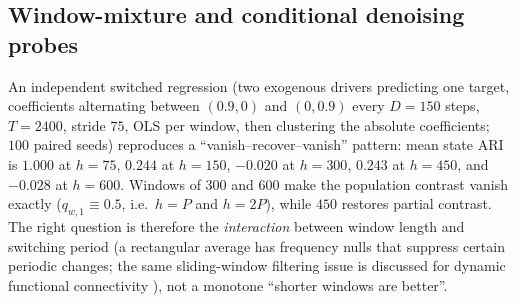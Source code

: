 \documentclass[11pt]{article}
\begin{document}
\subsection{Window-mixture and conditional denoising probes}
\label{supp:representation-probes}
An independent switched regression (two exogenous drivers predicting one target,
coefficients alternating between $(0.9,0)$ and $(0,0.9)$ every $D{=}150$ steps,
$T=2400$, stride $75$, OLS per window, then clustering the absolute coefficients;
$100$ paired seeds) reproduces a ``vanish--recover--vanish'' pattern: mean state
ARI is $1.000$ at $h{=}75$, $0.244$ at $h{=}150$, $-0.020$ at $h{=}300$,
$0.243$ at $h{=}450$, and $-0.028$ at $h{=}600$. Windows of $300$ and $600$ make
the population contrast vanish exactly ($q_{w,1}\equiv0.5$, i.e.\ $h{=}P$ and
$h{=}2P$), while $450$ restores partial contrast. The right question is therefore
the \emph{interaction} between window length and switching period (a rectangular
average has frequency nulls that suppress certain periodic changes; the same
sliding-window filtering issue is discussed for dynamic functional connectivity
\citep{leonardi2015spurious}), not a monotone ``shorter windows are better''.
\end{document}
